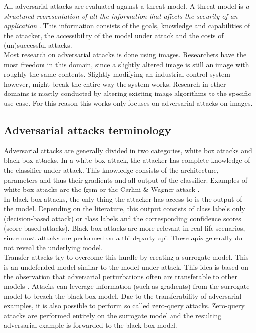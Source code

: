 All adversarial attacks are evaluated against a threat model. A threat model is \textit{a structured representation of all the information that affects the security of an application} \cite{threat_model}. This information consists of the goals, knowledge and capabilities of the attacker, the accessibility of the model under attack and the costs of (un)successful attacks.\\

Most research on adversarial attacks is done using images. Researchers have the most freedom in this domain, since a slightly altered image is still an image with roughly the same contents. Slightly modifying an industrial control system however, might break the entire way the system works. Research in other domains is mostly conducted by altering existing image algorithms to the specific use case. For this reason this works only focuses on adversarial attacks on images.\\ 


\subsection{Adversarial attacks terminology}
Adversarial attacks are generally divided in two categories, white box attacks and black box attacks. In a white box attack, the attacker has complete knowledge of the classifier under attack. This knowledge consists of the architecture, parameters and thus their gradients and all output of the classifier. Examples of white box attacks are the \gls{fgsm} \cite{FGSM} or the Carlini \& Wagner attack \cite{cw_attack}.\\

In black box attacks, the only thing the attacker has access to is the output of the model. Depending on the literature, this output consists of class labels only (decision-based attack) or class labels and the corresponding confidence scores (score-based attacks). Black box attacks are more relevant in real-life scenarios, since most attacks are performed on a third-party \gls{api}. These \glspl{api} generally do not reveal the underlying model.\\

Transfer attacks \cite{transfer_attack} try to overcome this hurdle by creating a surrogate model. This is an undefended model similar to the model under attack. This idea is based on the observation that adversarial perturbations often are transferable to other models \cite{FGSM}. Attacks can leverage information (such as gradients) from the surrogate model to breach the black box model. Due to the transferability of adversarial examples, it is also possible to perform so called zero-query attacks. Zero-query attacks are performed entirely on the surrogate model and the resulting adversarial example is forwarded to the black box model.\\

